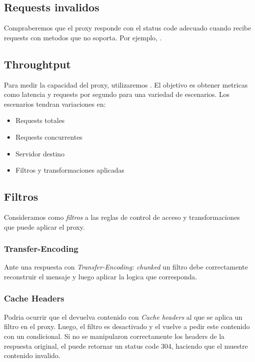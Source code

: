 \documentclass[11pt,a4paper,titlepage]{article}
\begin{document}
\subsection{Requests invalidos}
Compraberemos que el proxy responde con el status code adecuado cuando recibe requests con metodos que no soporta.
Por ejemplo, .


\subsection{Throughtput}
Para medir la capacidad del proxy, utilizaremos .
El objetivo es obtener metricas como latencia y requests por segundo para una variedad de escenarios.
Los escenarios tendran variaciones en:
\begin{itemize}
    \item Requests totales
    \item Requests concurrentes
    \item Servidor destino
    \item Filtros y transformaciones aplicadas
\end{itemize}

\subsection{Filtros}
Consideramos como \textit{filtros} a las reglas de control de acceso y transformaciones que puede aplicar el proxy.

\subsubsection{Transfer-Encoding}
Ante una respuesta con \textit{Transfer-Encoding: chunked} un filtro debe correctamente reconstruir el mensaje y luego aplicar la logica que corresponda.

\subsubsection{Cache Headers}
Podria ocurrir que el \os devuelva contenido con \textit{Cache headers} al que se aplica un filtro en el proxy.
Luego, el filtro es desactivado y el \ua vuelve a pedir este contenido con un  condicional.
Si no se manipularon correctamente los headers de la respuesta original, el \os puede retornar un status code 304, haciendo que el \ua muestre contenido invalido.
\end{document}
